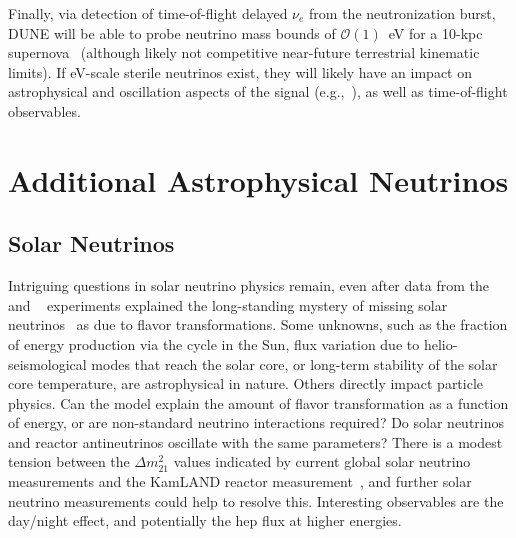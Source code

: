 Finally, via detection of time-of-flight delayed $\nu_e$ from the  neutronization burst,  DUNE will be able to probe neutrino mass bounds of $\mathcal{O}(1)$~eV for a 10-kpc supernova~\cite{Rossi-Torres:2015rla} (although likely not competitive near-future terrestrial kinematic limits).  If eV-scale sterile neutrinos exist, they will likely have an impact on astrophysical and oscillation aspects of the signal (e.g.,~\cite{Keranen:2007ga,Tamborra:2011is,Esmaili:2014gya}), as well as time-of-flight observables. \\





\section{Additional Astrophysical Neutrinos}
\label{sec:physics-snblowe-other}

\subsection{Solar Neutrinos}

Intriguing questions in solar neutrino physics remain, even after data
from the  and ~\cite{Fukuda:2001nj,Ahmad:2001an}
experiments explained the long-standing mystery of missing solar
neutrinos~\cite{Cleveland:1998nv} as due to flavor transformations.
Some unknowns, such as the fraction of energy production via the
 cycle in the Sun, flux variation due to
helio-seismological modes that reach the solar core, or long-term
stability of the solar core temperature, are astrophysical in
nature. Others directly impact particle physics.  Can the 
model explain the amount of flavor transformation as a function of
energy, or are non-standard neutrino interactions required?  Do solar
neutrinos and reactor antineutrinos oscillate with the same
parameters?  There is a modest tension between the $\Delta m^2_{21}$
values indicated by current global solar neutrino measurements and the
KamLAND reactor measurement~\cite{Capozzi:2018dat}, and further solar
neutrino measurements could help to resolve this.  Interesting
observables are the day/night effect, and potentially the hep flux at
higher energies.

